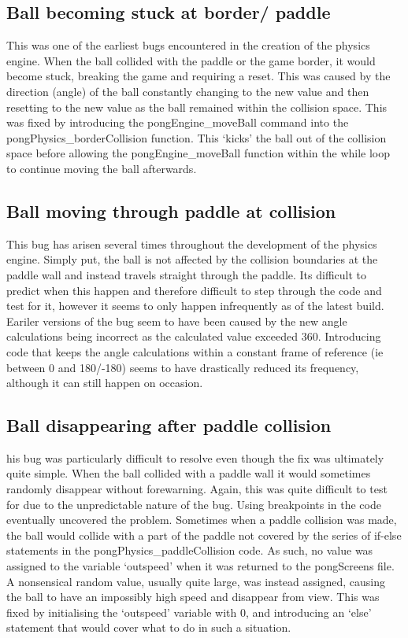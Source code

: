\documentclass[a4paper,12pt]{article}
\begin{document}
\subsection{Ball becoming stuck at border/ paddle}
\begin{flushleft}
This was one of the earliest bugs encountered in the creation of the physics engine. When the ball collided with the paddle or the game border, it would become stuck, breaking the game and requiring a reset. This was caused by the direction (angle) of the ball constantly changing to the new value and then resetting to the new value as the ball remained within the collision space. This was fixed by introducing the pongEngine\_moveBall command into the pongPhysics\_borderCollision function. This ‘kicks’ the ball out of the collision space before allowing the pongEngine\_moveBall function within the while loop to continue moving the ball afterwards.
\end{flushleft}
\subsection{Ball moving through paddle at collision}
\begin{flushleft}
This bug has arisen several times throughout the development of the physics engine. Simply put, the ball is not affected by the collision boundaries at the paddle wall and instead travels straight through the paddle. Its difficult to predict when this happen and therefore difficult to step through the code and test for it, however it seems to only happen infrequently as of the latest build. Eariler versions of the bug seem to have been caused by the new angle calculations being incorrect as the calculated value exceeded 360. Introducing code that keeps the angle calculations within a constant frame of reference (ie between 0 and 180/-180) seems to have drastically reduced its frequency, although it can still happen on occasion.
\end{flushleft}
\subsection{Ball disappearing after paddle collision}
\begin{flushleft}
his bug was particularly difficult to resolve even though the fix was ultimately quite simple. When the ball collided with a paddle wall it would sometimes randomly disappear without forewarning. Again, this was quite difficult to test for due to the unpredictable nature of the bug. Using breakpoints in the code eventually uncovered the problem. Sometimes when a paddle collision was made, the ball would collide with a part of the paddle not covered by the series of if-else statements in the pongPhysics\_paddleCollision code. As such, no value was assigned to the variable ‘outspeed’ when it was returned to the pongScreens file. A nonsensical random value, usually quite large, was instead assigned, causing the ball to have an impossibly high speed and disappear from view. This was fixed by initialising the ‘outspeed’ variable with 0, and introducing an ‘else’ statement that would cover what to do in such a situation.
\end{flushleft}
\newpage
\end{document}
